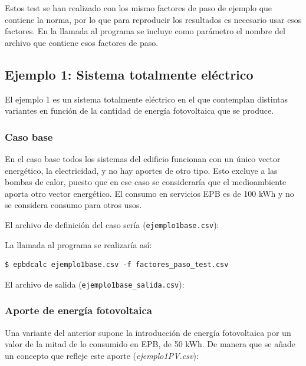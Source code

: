 \documentclass[10pt,notitlepage,oneside,a4paper]{article}
\begin{document}
Estos test se han realizado con los mismo factores de paso de ejemplo que contiene la norma, por lo que para reproducir los resultados es necesario usar esos factores. En la llamada al programa se incluye como parámetro el nombre del archivo que contiene esos factores de paso.

\subsection{Ejemplo 1: Sistema totalmente eléctrico}
El ejemplo 1 es un sistema totalmente eléctrico en el que contemplan distintas variantes en función de la cantidad de energía fotovoltaica que se produce.


\subsubsection{Caso base}
 
En el caso base todos los sistemas del edificio funcionan con un único vector energético, la electricidad, y no hay aportes de otro tipo. Esto excluye a las bombas de calor, puesto que en ese caso se consideraría que el medioambiente aporta otro vector energético. El consumo en servicios EPB es de 100 kWh y no se considera consumo para otros usos.

El archivo de definición del caso sería (\texttt{ejemplo1base.csv}):


La llamada al programa se realizaría así:

\begin{Verbatim}[fontsize=\small]
    $ epbdcalc ejemplo1base.csv -f factores_paso_test.csv
\end{Verbatim}

El archivo de salida (\texttt{ejemplo1base\_salida.csv}):


\subsubsection{Aporte de energía fotovoltaica}

Una variante del anterior supone la introducción de energía fotovoltaica por un valor de la mitad de lo consumido en EPB, de 50 kWh. De manera que se añade un concepto que refleje este aporte (\textit{ejemplo1PV.csv}):
\end{document}
